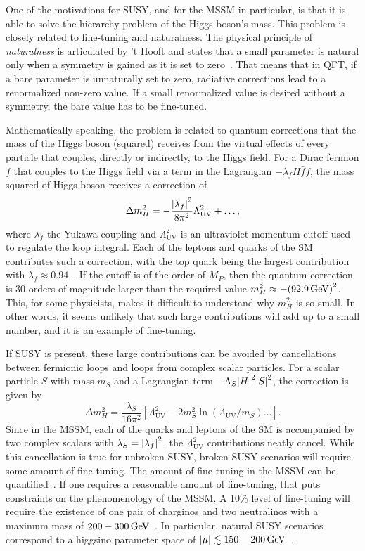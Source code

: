 One of the motivations for SUSY, and for the MSSM in particular, is that it is able to solve the hierarchy problem of the Higgs boson's mass. This problem is closely related to fine-tuning and naturalness. The physical principle of \emph{naturalness} is articulated by ’t Hooft and states that a small parameter is natural only when a symmetry is gained as it is set to zero~\cite{tHooft:1980xss,Seiberg_1993}. That means that in QFT, if a bare parameter is unnaturally set to zero, radiative corrections lead to a renormalized non-zero value. If a small renormalized value is desired without a symmetry, the bare value has to be fine-tuned.

Mathematically speaking, the problem is related to quantum corrections that the mass of the Higgs boson (squared) receives from the virtual effects of every particle that couples, directly or indirectly, to the Higgs field. For a Dirac fermion $f$ that couples to the Higgs field via a term in the Lagrangian $-\lambda_f H \bar{f}f$, the mass squared of Higgs boson receives a correction of
\begin{equation}
\Delta m^2_H = -\frac{\abs{\lambda_f}^2}{8\pi^2}\Lambda^2_{\mathrm{UV}}+\ldots,
\end{equation} 
where $\lambda_f$ the Yukawa coupling and $\Lambda^2_{\mathrm{UV}}$ is an ultraviolet momentum cutoff used to regulate the loop integral. Each of the leptons and quarks of the SM contributes such a correction, with the top quark being the largest contribution with $\lambda_f\approx 0.94$~\cite{MARTIN_1998}. If the cutoff is of the order of $M_P$, then the quantum correction is 30 orders of magnitude larger than the required value $m^2_H\approx-\qty(92.9\,\text{Ge\hspace{-.08em}V})^2$. This, for some physicists, makes it difficult to understand why $m^2_H$ is so small. In other words, it seems unlikely that such large contributions will add up to a small number, and it is an example of fine-tuning.

If SUSY is present, these large contributions can be avoided by cancellations between fermionic loops and loops from complex scalar particles. For a scalar particle $S$ with mass $m_S$ and a Lagrangian term $-\Lambda_S\abs{H}^2\abs{S}^2$, the correction is given by
\begin{equation}
\Delta m^2_H = \frac{\lambda_S}{16\pi^2}\left[\Lambda^2_{\mathrm{UV}} -2m_S^2\ln(\Lambda_{\mathrm{UV}}/m_S) \ldots\right].
\end{equation}
Since in the MSSM, each of the quarks and leptons of the SM is accompanied by two complex scalars with $\lambda_S=\abs{\lambda_f}^2$, the $\Lambda^2_{\mathrm{UV}}$ contributions neatly cancel. While this cancellation is true for unbroken SUSY, broken SUSY scenarios will require some amount of fine-tuning. The amount of fine-tuning in the MSSM can be quantified~\cite{Feng_2013,PhysRevD.58.096004}. If one requires a reasonable amount of fine-tuning, that puts constraints on the phenomenology of the MSSM. A 10\% level of fine-tuning will require the existence of one pair of charginos and two neutralinos with a maximum mass of $200-300\,\text{Ge\hspace{-.08em}V}$~\cite{natural-SUSY,BARBIERI198863,Antusch_2013,Papucci_2012}. In particular, natural SUSY scenarios correspond to a higgsino parameter space of $\abs{\mu}\lesssim 150-200\,\text{Ge\hspace{-.08em}V}$~\cite{Baer_2012}.
